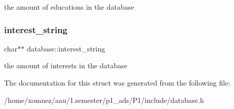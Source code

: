 the amount of educations in the database \mbox{\label{structdatabase_aa677885704df7723ae0211e7f8977cc0}} 
\subsubsection{\texorpdfstring{interest\+\_\+string}{interest\_string}}
{\footnotesize\ttfamily char$\ast$$\ast$ database\+::interest\+\_\+string}

the amount of interests in the database 

The documentation for this struct was generated from the following file\+:\begin{DoxyCompactItemize}
\item 
/home/xomnez/aau/1.\+semester/p1\+\_\+ads/\+P1/include/database.\+h\end{DoxyCompactItemize}
